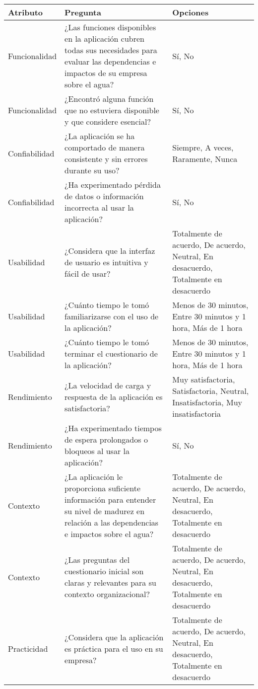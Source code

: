 \begin{longtable}{p{2.5cm}|p{8cm}|p{5cm}}
    \textbf{Atributo} & \textbf{Pregunta} & \textbf{Opciones}\\
    \hline\hline
    Funcionalidad & ¿Las funciones disponibles en la aplicación cubren todas sus necesidades para evaluar las dependencias e impactos de su empresa sobre el agua? & Sí, No \\
\hline
Funcionalidad & ¿Encontró alguna función que no estuviera disponible y que considere esencial? & Sí, No \\
\hline
Confiabilidad & ¿La aplicación se ha comportado de manera consistente y sin errores durante su uso? & Siempre, A veces, Raramente, Nunca \\
\hline
Confiabilidad & ¿Ha experimentado pérdida de datos o información incorrecta al usar la aplicación? & Sí, No \\
\hline
Usabilidad & ¿Considera que la interfaz de usuario es intuitiva y fácil de usar? & Totalmente de acuerdo, De acuerdo, Neutral, En desacuerdo, Totalmente en desacuerdo \\
\hline
Usabilidad & ¿Cuánto tiempo le tomó familiarizarse con el uso de la aplicación? & Menos de 30 minutos, Entre 30 minutos y 1 hora, Más de 1 hora \\
\hline
Usabilidad & ¿Cuánto tiempo le tomó terminar el cuestionario de la aplicación? & Menos de 30 minutos, Entre 30 minutos y 1 hora, Más de 1 hora \\
\hline
Rendimiento & ¿La velocidad de carga y respuesta de la aplicación es satisfactoria? & Muy satisfactoria, Satisfactoria, Neutral, Insatisfactoria, Muy insatisfactoria \\
\hline
Rendimiento & ¿Ha experimentado tiempos de espera prolongados o bloqueos al usar la aplicación? & Sí, No \\
\hline
Contexto & ¿La aplicación le proporciona suficiente información para entender su nivel de madurez en relación a las dependencias e impactos sobre el agua? & Totalmente de acuerdo, De acuerdo, Neutral, En desacuerdo, Totalmente en desacuerdo \\
\hline
Contexto & ¿Las preguntas del cuestionario inicial son claras y relevantes para su contexto organizacional? & Totalmente de acuerdo, De acuerdo, Neutral, En desacuerdo, Totalmente en desacuerdo \\
\hline
Practicidad & ¿Considera que la aplicación es práctica para el uso en su empresa? & Totalmente de acuerdo, De acuerdo, Neutral, En desacuerdo, Totalmente en desacuerdo \\

\end{longtable}
